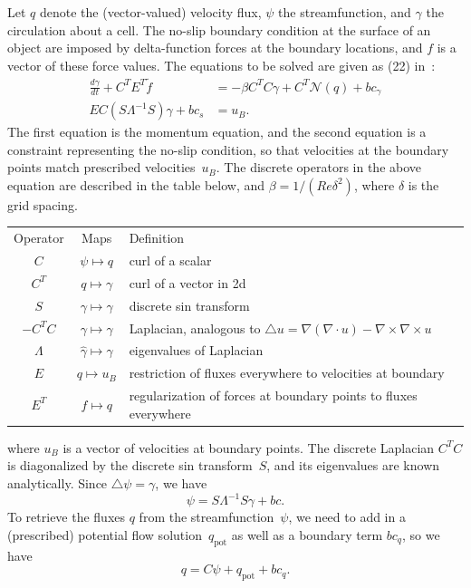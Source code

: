 \documentclass[11pt]{article}
\begin{document}
Let $q$ denote the (vector-valued) velocity flux, $\psi$ the streamfunction, and $\gamma$ the circulation about a cell.  The no-slip boundary condition at the surface of an object are imposed by delta-function forces at the boundary locations, and $f$ is a vector of these force values.  The equations to be solved are given as (22) in~\cite{ColTai-07}:
\begin{align}
	\frac{d\gamma}{dt} + C^TE^T\tilde f &= -\beta C^TC\gamma + C^T\mathcal{N}(q) + bc_\gamma
	\label{eq:navier_stokes}\\
EC(S\Lambda^{-1}S)\gamma + bc_s &= u_B.
\label{eq:no_slip}
\end{align}
The first equation is the momentum equation, and the second equation is a constraint representing the no-slip condition, so that velocities at the boundary points match prescribed velocities~$u_B$. The discrete operators in the above equation are described in the table below, and $\beta=1/(Re\delta^2)$, where $\delta$ is the grid spacing.  \begin{center}
\begin{tabular}{ccp{3.5in}}
Operator & Maps & Definition\\
$C$ 	& $\psi\mapsto q$ & curl of a scalar\\
$C^T$ 	& $q\mapsto \gamma$ & curl of a vector in 2d\\
$S$ 	& $\gamma\mapsto\hat\gamma$ & discrete sin transform\\
$-C^TC$	& $\gamma\mapsto\gamma$ & Laplacian, analogous to $\triangle u = \nabla(\nabla\cdot u) - \nabla\times\nabla\times u$\\
$\Lambda$	& $\hat\gamma\mapsto\hat\gamma$ & eigenvalues of Laplacian\\
$E$ 	& $q\mapsto u_B$ & restriction of fluxes everywhere to velocities at boundary\\
$E^T$	& $f\mapsto q$ & regularization of forces at boundary points to fluxes everywhere
\end{tabular}
\end{center}
where $u_B$ is a vector of velocities at boundary points.  The discrete Laplacian $C^TC$ is diagonalized by the discrete sin transform~$S$, and its eigenvalues are known analytically.  Since $\triangle\psi =\gamma$, we have
\begin{equation}
	\psi = S\Lambda^{-1}S\gamma + bc.
\end{equation}
To retrieve the fluxes $q$ from the streamfunction~$\psi$, we need to add in a (prescribed) potential flow solution~$q_\text{pot}$ as well as a boundary term $bc_q$, so we have
\begin{equation}
	q = C\psi + q_\text{pot} + bc_q.
\end{equation}
\end{document}
